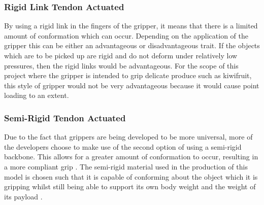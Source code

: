 \documentclass[11pt,twocolumn]{article}
\begin{document}
\subsubsection{Rigid Link Tendon Actuated}
By using a rigid link in the fingers of the gripper, it means that there is a limited amount of conformation which can occur. Depending on the application of the gripper this can be either an advantageous or disadvantageous trait. If the objects which are to be picked up are rigid and do not deform under relatively low pressures, then the rigid links would be advantageous. For the scope of this project where the gripper is intended to grip delicate produce such as kiwifruit, this style of gripper would not be very advantageous because it would cause point loading to an extent.

\subsubsection{Semi-Rigid Tendon Actuated}
Due to the fact that grippers are being developed to be more universal, more of the developers choose to make use of the second option of using a semi-rigid backbone. This allows for a greater amount of conformation to occur, resulting in a more compliant grip \cite{marchese2015recipe}. The semi-rigid material used in the production of this model is chosen such that it is capable of conforming about the object which it is gripping whilst still being able to support its own body weight and the weight of its payload \cite{hassan2015design}.
\end{document}
